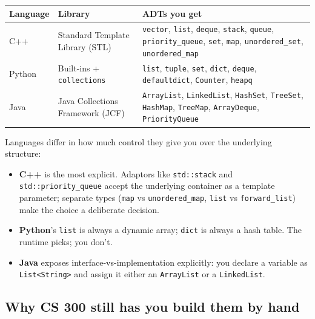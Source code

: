 \documentclass[11pt]{article}
\begin{document}
\begin{center}
\footnotesize
\renewcommand{\arraystretch}{1.3}
\begin{tabular}{@{}p{2.2cm}p{3.6cm}p{7.1cm}@{}}
\hline
\textbf{Language} & \textbf{Library} & \textbf{ADTs you get} \\
\hline
C++    & Standard Template Library (STL) &
        \texttt{vector}, \texttt{list}, \texttt{deque},
        \texttt{stack}, \texttt{queue}, \texttt{priority\_queue},
        \texttt{set}, \texttt{map}, \texttt{unordered\_set},
        \texttt{unordered\_map} \\
Python & Built-ins + \texttt{collections} &
        \texttt{list}, \texttt{tuple}, \texttt{set}, \texttt{dict},
        \texttt{deque}, \texttt{defaultdict}, \texttt{Counter},
        \texttt{heapq} \\
Java   & Java Collections Framework (JCF) &
        \texttt{ArrayList}, \texttt{LinkedList}, \texttt{HashSet},
        \texttt{TreeSet}, \texttt{HashMap}, \texttt{TreeMap},
        \texttt{ArrayDeque}, \texttt{PriorityQueue} \\
\hline
\end{tabular}
\end{center}

\begin{notebox}
Languages differ in how much control they give you over the
underlying structure:
\begin{itemize}[leftmargin=*]
  \item \textbf{C++} is the most explicit. Adaptors like
        \texttt{std::stack} and \texttt{std::priority\_queue} accept
        the underlying container as a template parameter; separate
        types (\texttt{map} vs \texttt{unordered\_map},
        \texttt{list} vs \texttt{forward\_list}) make the choice a
        deliberate decision.
  \item \textbf{Python}'s \texttt{list} is always a dynamic array;
        \texttt{dict} is always a hash table. The runtime picks; you
        don't.
  \item \textbf{Java} exposes interface-vs-implementation explicitly:
        you declare a variable as \texttt{List<String>} and assign
        it either an \texttt{ArrayList} or a \texttt{LinkedList}.
\end{itemize}
\end{notebox}

\subsection{Why CS 300 still has you build them by hand}
\end{document}
